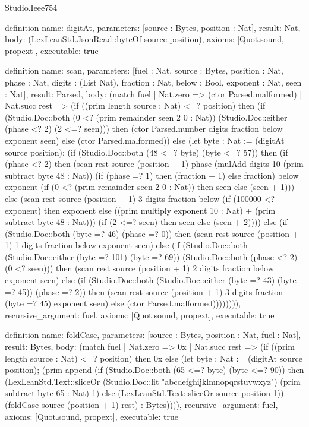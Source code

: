 \begin{lexlean}{Studio.Ieee754}
\begin{semanticmodule}
definition{
  name: digitAt,
  parameters: [source : Bytes, position : Nat],
  result: Nat,
  body: (LexLeanStd.JsonRead::byteOf source position),
  axioms: [Quot.sound, propext],
  executable: true
}

definition{
  name: scan,
  parameters: [fuel : Nat, source : Bytes, position : Nat, phase : Nat, digits : (List Nat), fraction : Nat, below : Bool, exponent : Nat, seen : Nat],
  result: Parsed,
  body: (match fuel
    | Nat.zero => (ctor Parsed.malformed)
    | Nat.succ rest => (if ((prim length source : Nat) <=? position) then (if (Studio.Doc::both (0 <? (prim remainder seen 2 0 : Nat)) (Studio.Doc::either (phase <? 2) (2 <=? seen))) then (ctor Parsed.number digits fraction below exponent seen) else (ctor Parsed.malformed)) else (let byte : Nat := (digitAt source position); (if (Studio.Doc::both (48 <=? byte) (byte <=? 57)) then (if (phase <? 2) then (scan rest source (position + 1) phase (mulAdd digits 10 (prim subtract byte 48 : Nat)) (if (phase =? 1) then (fraction + 1) else fraction) below exponent (if (0 <? (prim remainder seen 2 0 : Nat)) then seen else (seen + 1))) else (scan rest source (position + 1) 3 digits fraction below (if (100000 <? exponent) then exponent else ((prim multiply exponent 10 : Nat) + (prim subtract byte 48 : Nat))) (if (2 <=? seen) then seen else (seen + 2)))) else (if (Studio.Doc::both (byte =? 46) (phase =? 0)) then (scan rest source (position + 1) 1 digits fraction below exponent seen) else (if (Studio.Doc::both (Studio.Doc::either (byte =? 101) (byte =? 69)) (Studio.Doc::both (phase <? 2) (0 <? seen))) then (scan rest source (position + 1) 2 digits fraction below exponent seen) else (if (Studio.Doc::both (Studio.Doc::either (byte =? 43) (byte =? 45)) (phase =? 2)) then (scan rest source (position + 1) 3 digits fraction (byte =? 45) exponent seen) else (ctor Parsed.malformed)))))))),
  recursive_argument: fuel,
  axioms: [Quot.sound, propext],
  executable: true
}

definition{
  name: foldCase,
  parameters: [source : Bytes, position : Nat, fuel : Nat],
  result: Bytes,
  body: (match fuel
    | Nat.zero => 0x
    | Nat.succ rest => (if ((prim length source : Nat) <=? position) then 0x else (let byte : Nat := (digitAt source position); (prim append (if (Studio.Doc::both (65 <=? byte) (byte <=? 90)) then (LexLeanStd.Text::sliceOr (Studio.Doc::lit "abcdefghijklmnopqrstuvwxyz") (prim subtract byte 65 : Nat) 1) else (LexLeanStd.Text::sliceOr source position 1)) (foldCase source (position + 1) rest) : Bytes)))),
  recursive_argument: fuel,
  axioms: [Quot.sound, propext],
  executable: true
}


\end{semanticmodule}
\end{lexlean}
